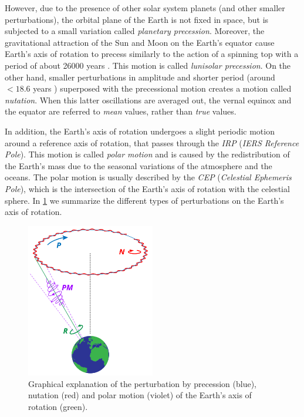 \documentclass[../main.tex]{subfiles}
\begin{document}
However, due to the presence of other solar system planets (and other smaller perturbations), the orbital plane of the Earth is not fixed in space, but is subjected to a small variation called \emph{planetary precession}. Moreover, the gravitational attraction of the Sun and Moon on the Earth's equator cause Earth's axis of rotation to precess similarly to the action of a spinning top with a period of about 26000 years \cite{montenbruck}. This motion is called \emph{lunisolar precession}. On the other hand, smaller perturbations in amplitude and shorter period (around $<18.6$ years \cite{wiki:eci}) superposed with the precessional motion creates a motion called \emph{nutation}. When this latter oscillations are averaged out, the vernal equinox and the equator are referred to \emph{mean} values, rather than \emph{true} values.

In addition, the Earth's axis of rotation undergoes a slight periodic motion around a reference axis of rotation, that passes through the \emph{IRP} (\emph{IERS Reference Pole}). This motion is called \emph{polar motion} and is caused by the redistribution of the Earth's mass due to the seasonal variations of the atmosphere and the oceans. The polar motion is usually described by the \emph{CEP} (\emph{Celestial Ephemeris Pole}), which is the intersection of the Earth's axis of rotation with the celestial sphere. In \cref{fig:prec_nut} we summarize the different types of perturbations on the Earth's axis of rotation.

\begin{figure}[ht]
  \centering
  \includegraphics[width=0.5\textwidth]{Images/precession_nutation.pdf}
  \caption{Graphical explanation of the perturbation by precession (blue), nutation (red) and polar motion (violet) of the Earth's axis of rotation (green).}
  \label{fig:prec_nut}
\end{figure}
\end{document}
